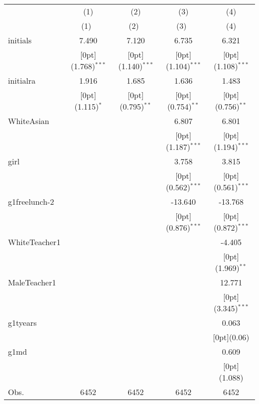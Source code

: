 \begin{tabular*}{\textwidth}{@{\extracolsep{\fill}}lcccc}				
	& \multicolumn{1}{c}{(1)} &	\multicolumn{1}{c}{(2)} &	\multicolumn{1}{c}{(3)} &	\multicolumn{1}{c}{(4)} \\
\cline{2-5}				
	& \multicolumn{1}{c}{(1)\mbox{\ }} &	\multicolumn{1}{c}{(2)\mbox{\ }} &	\multicolumn{1}{c}{(3)\mbox{\ }} &	\multicolumn{1}{c}{(4)} \\
\hline				
initials &	7.490 &	7.120 &	6.735 &	6.321 \\
&	\raisebox{.7ex}[0pt]{\scriptsize (1.768)$^{***}$} &	\raisebox{.7ex}[0pt]{\scriptsize (1.140)$^{***}$} &	\raisebox{.7ex}[0pt]{\scriptsize (1.104)$^{***}$} &	\raisebox{.7ex}[0pt]{\scriptsize (1.108)$^{***}$} \\
initialra &	1.916 &	1.685 &	1.636 &	1.483 \\
&	\raisebox{.7ex}[0pt]{\scriptsize (1.115)$^{*}$} &	\raisebox{.7ex}[0pt]{\scriptsize (0.795)$^{**}$} &	\raisebox{.7ex}[0pt]{\scriptsize (0.754)$^{**}$} &	\raisebox{.7ex}[0pt]{\scriptsize (0.756)$^{**}$} \\
WhiteAsian &	&	&	6.807 &	6.801 \\
&	&	&	\raisebox{.7ex}[0pt]{\scriptsize (1.187)$^{***}$} &	\raisebox{.7ex}[0pt]{\scriptsize (1.194)$^{***}$} \\
girl &	&	&	3.758 &	3.815 \\
&	&	&	\raisebox{.7ex}[0pt]{\scriptsize (0.562)$^{***}$} &	\raisebox{.7ex}[0pt]{\scriptsize (0.561)$^{***}$} \\
g1freelunch-2 &	&	&	-13.640 &	-13.768 \\
&	&	&	\raisebox{.7ex}[0pt]{\scriptsize (0.876)$^{***}$} &	\raisebox{.7ex}[0pt]{\scriptsize (0.872)$^{***}$} \\
WhiteTeacher1 &	&	&	&	-4.405 \\
&	&	&	&	\raisebox{.7ex}[0pt]{\scriptsize (1.969)$^{**}$} \\
MaleTeacher1 &	&	&	&	12.771 \\
&	&	&	&	\raisebox{.7ex}[0pt]{\scriptsize (3.345)$^{***}$} \\
g1tyears &	&	&	&	0.063 \\
&	&	&	&	\raisebox{.7ex}[0pt]{\scriptsize (0.06)} \\
g1md &	&	&	&	0.609 \\
&	&	&	&	\raisebox{.7ex}[0pt]{\scriptsize (1.088)} \\
Obs. &	6452 &	6452 &	6452 &	6452 \\
\hline\hline				
\end{tabular*}%
